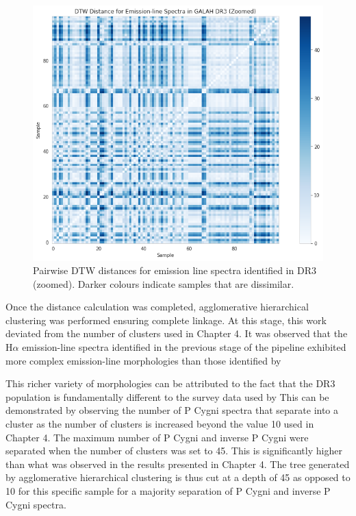\begin{figure}[!htb]
\centering
\includegraphics[scale=0.50]{figures/dtw distances dr3 zoomed.png}
\caption{Pairwise DTW distances for emission line spectra identified in DR3 (zoomed). Darker colours indicate samples that are dissimilar.}
\end{figure}

Once the distance calculation was completed, agglomerative hierarchical clustering was performed ensuring complete linkage. At this stage, this work deviated from the number of clusters used in Chapter 4. It was observed that the H$\alpha$ emission-line spectra identified in the previous stage of the pipeline exhibited more complex emission-line morphologies than those identified by \citet{vcotar2021galah} 

This richer variety of morphologies can be attributed to the fact that the DR3 population is fundamentally different to the survey data used by \citet{vcotar2021galah} This can be demonstrated by observing the number of P Cygni spectra that separate into a cluster as the number of clusters is increased beyond the value 10 used in Chapter 4. The maximum number of P Cygni and inverse P Cygni were separated when the number of clusters was set to 45. This is significantly higher than what was observed in the results presented in Chapter 4. The tree generated by agglomerative hierarchical clustering is thus cut at a depth of 45 as opposed to 10 for this specific sample for a majority separation of P Cygni and inverse P Cygni spectra. 

